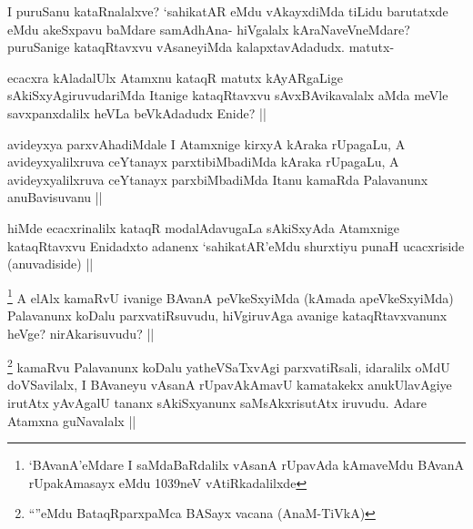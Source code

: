 
\begin{artha}
I puruSanu kataRnalalxve? `sahikatAR eMdu vAkayxdiMda tiLidu barutatxde eMdu akeSxpavu baMdare samAdhAna- hiVgalalx kAraNaveVneMdare? puruSanige kataqRtavxvu vAsaneyiMda kalapxtavAdadudx. matutx-
\end{artha}

\begin{artha}
ecacxra kAladalUlx Atamxnu kataqR matutx kAyARgaLige sAkiSxyAgiruvudariMda Itanige kataqRtavxvu sAvxBAvikavalalx aMda meVle savxpanxdalilx heVLa beVkAdadudx Enide? ||
\end{artha}

\begin{artha}
avideyxya parxvAhadiMdale I Atamxnige kirxyA kAraka rUpagaLu, A avideyxyalilxruva ceYtanayx parxtibiMbadiMda kAraka rUpagaLu, A avideyxyalilxruva ceYtanayx parxbiMbadiMda Itanu kamaRda Palavanunx anuBavisuvanu ||
\end{artha}


\begin{artha}
hiMde ecacxrinalilx kataqR modalAdavugaLa sAkiSxyAda Atamxnige kataqRtavxvu Enidadxto adanenx `sahikatAR'eMdu shurxtiyu punaH ucacxriside (anuvadiside) ||
\end{artha}


\begin{artha}
\footnote{`BAvanA'eMdare I saMdaBaRdalilx vAsanA rUpavAda kAmaveMdu BAvanA rUpakAmasayx eMdu 1039neV vAtiRkadalilxde}
A elAlx kamaRvU ivanige BAvanA peVkeSxyiMda (kAmada apeVkeSxyiMda) Palavanunx koDalu parxvatiRsuvudu, hiVgiruvAga avanige kataqRtavxvanunx heVge? nirAkarisuvudu? ||
\end{artha}


\begin{artha}
\footnote{``\stext''eMdu BataqRparxpaMca BASayx vacana (AnaM-TiVkA)}
kamaRvu Palavanunx koDalu yatheVSaTxvAgi parxvatiRsali, idaralilx oMdU doVSavilalx, I BAvaneyu vAsanA rUpavAkAmavU kamatakekx anukUlavAgiye irutAtx yAvAgalU tananx sAkiSxyanunx saMsAkxrisutAtx iruvudu. Adare Atamxna guNavalalx || 
\end{artha}

